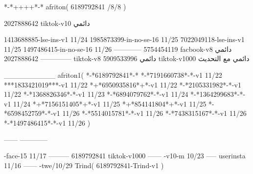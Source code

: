 *-*++++*-*
afriton(
6189792841 /8/8
)

2027888642 tiktok-v10
دائمي

1413688885-lse-ins-v1 11/24
1985873399-in-no-se-16 11/25
7022049118-lse-ins-v1 11/25
1497486415-in-no-se-16 11/26
------------
5754454119 facbook-v8
دائمي
--------------
2027888642 tiktok-v8
دائمي
5909533996 tiktok-v1000
دائمي مع التحديث

__________
afriton1(
*-*6189792841*-*
*-*7191660738*-*-v1 11/22
***1833421019***-v1 11/22
*+*6950935816*+*-v1 11/22
*-*2105331982*-*-v1 11/22
*-*1368826346*-*-v1 11/23
*-*6894079762*-*-v1 11/24
*-*1364299683*-*-v1 11/24
*+*7156151405*+*-v1 11/25
*+*854141804*+*-v1 11/25
*-*6598452759*-*-v1 11/26
*-*5514015781*-*-v1 11/26
*-*7438315167*-*-v1 11/26
*-*1497486415*-*-v1 11/26
)

------
------------

-face-15 11/17
---------
6189792841 tiktok-v1000
------
-v10-m 10/23
-----
userinsta 11/16
------
-twe/10/29
Trind(
6189792841-Trind-v1 
)
